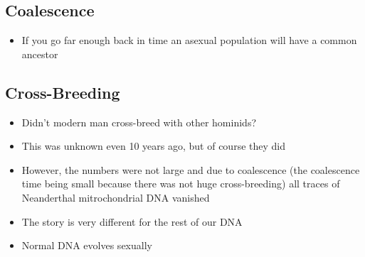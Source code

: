 
\begin{slide}
\section[-2]{Coalescence}

\pause
\pb
{}
\begin{center}
  \pause
\end{center}
\begin{itemize}
\item If you go far enough back in time an asexual population will have a
  common ancestor\pause
\end{itemize}
\end{slide}


\begin{slide}
\section{Cross-Breeding}

\begin{PauseHighLight}
  \begin{itemize}
  \item Didn't modern man cross-breed with other hominids?\pause
  \item This was unknown even 10 years ago\pause, but of course they
    did\pauseb
  \item However, the numbers were not large and due to coalescence (the
    coalescence time being small because there was not huge
    cross-breeding) all traces of Neanderthal  mitrochondrial DNA vanished\pause
  \item The story is very different for the rest of our DNA\pause
  \item Normal DNA evolves sexually\pause
  \end{itemize}
\end{PauseHighLight}

\end{slide}


